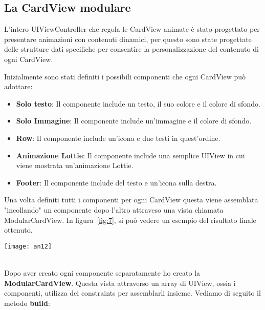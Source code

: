 \subsection{La CardView modulare}

L'intero UIViewController che regola le CardView animate è stato progettato per presentare 
animazioni con contenuti dinamici, per questo sono state progettate delle strutture dati specifiche per consentire la personalizzazione
del contenuto di ogni CardView. 

Inizialmente sono stati definiti i possibili componenti che ogni CardView può adottare:
\begin{itemize}
    \item\textbf{Solo testo}: Il componente include un testo, il suo colore e il colore di sfondo.
    \item\textbf{Solo Immagine}: Il componente include un'immagine e il colore di sfondo.
    \item\textbf{Row}: Il componente include un'icona e due testi in quest'ordine.
    \item\textbf{Animazione Lottie\cite{lottie}}: Il componente include una semplice UIView in cui viene mostrata un'animazione Lottie.
    \item\textbf{Footer}: Il componente include del testo e un'icona sulla destra.
\end{itemize}

Una volta definiti tutti i componenti per ogni CardView questa viene assemblata "incollando" un componente
dopo l'altro attraveso una vista chiamata ModularCardView. In figura~\ref{fig:7}, si può vedere un esempio del risultato finale ottenuto. \\

\begin{minipage}{\linewidth}
    \centering
    \texttt{[image: an12]}
    \label{fig:7}
\end{minipage}\\

Dopo aver creato ogni componente separatamente ho creato la \textbf{ModularCardView}.
Questa vista attraverso un array di UIView, ossia i componenti, utilizza dei constraints 
per assemblarli insieme. Vediamo di seguito il metodo \textbf{build}:

